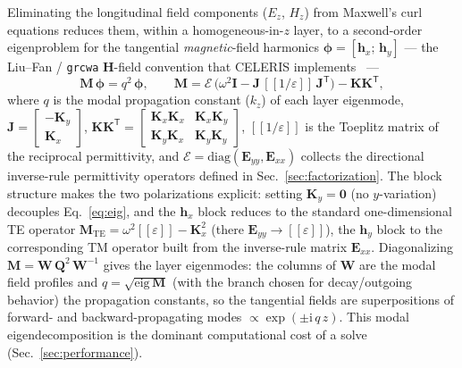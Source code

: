 \documentclass[preprint,12pt]{elsarticle}
\providecommand{\llbracket}{[\![}
\providecommand{\rrbracket}{]\!]}
\begin{document}
Eliminating the longitudinal field components ($E_z$, $H_z$) from Maxwell's curl
equations reduces them, within a homogeneous-in-$z$ layer, to a second-order
eigenproblem for the tangential \emph{magnetic}-field harmonics
$\boldsymbol{\phi}=[\mathbf{h}_x;\,\mathbf{h}_y]$ --- the Liu--Fan / \texttt{grcwa}
$\mathbf{H}$-field convention that CELERIS implements~\cite{liu2012s4,grcwa} ---
\begin{equation}
\mathbf{M}\,\boldsymbol{\phi} = q^2\,\boldsymbol{\phi},
\qquad
\mathbf{M} = \boldsymbol{\mathcal{E}}\,
   \big(\omega^2\mathbf{I} - \mathbf{J}\,\llbracket 1/\varepsilon\rrbracket\,
   \mathbf{J}^{\mathsf{T}}\big) - \mathbf{K}\mathbf{K}^{\mathsf{T}},
\label{eq:eig}
\end{equation}
where $q$ is the modal propagation constant ($k_z$) of each layer eigenmode,
$\mathbf{J}=\left[\begin{smallmatrix}-\mathbf{K}_y\\ \mathbf{K}_x\end{smallmatrix}\right]$,
$\mathbf{K}\mathbf{K}^{\mathsf{T}}=
\left[\begin{smallmatrix}\mathbf{K}_x\mathbf{K}_x & \mathbf{K}_x\mathbf{K}_y\\[2pt]
\mathbf{K}_y\mathbf{K}_x & \mathbf{K}_y\mathbf{K}_y\end{smallmatrix}\right]$,
$\llbracket 1/\varepsilon\rrbracket$ is the Toeplitz matrix of the reciprocal
permittivity, and $\boldsymbol{\mathcal{E}}=\mathrm{diag}(\mathbf{E}_{yy},
\mathbf{E}_{xx})$ collects the directional inverse-rule permittivity operators
defined in Sec.~\ref{sec:factorization}. The block structure makes the two
polarizations explicit: setting $\mathbf{K}_y=\mathbf{0}$ (no $y$-variation)
decouples Eq.~\eqref{eq:eig}, and the $\mathbf{h}_x$ block reduces to the standard
one-dimensional TE operator
$\mathbf{M}_{\mathrm{TE}}=\omega^2\llbracket\varepsilon\rrbracket-\mathbf{K}_x^2$
(there $\mathbf{E}_{yy}\!\to\!\llbracket\varepsilon\rrbracket$), the $\mathbf{h}_y$
block to the corresponding TM operator built from the inverse-rule matrix
$\mathbf{E}_{xx}$. Diagonalizing $\mathbf{M}=\mathbf{W}\,\mathbf{Q}^2\,
\mathbf{W}^{-1}$ gives the layer eigenmodes: the columns of $\mathbf{W}$ are the
modal field profiles and $q=\sqrt{\text{eig}\,\mathbf{M}}$ (with the branch chosen
for decay/outgoing behavior) the propagation constants, so the tangential fields
are superpositions of forward- and backward-propagating modes $\propto
\exp(\pm\mathrm{i}\,q\,z)$. This modal eigendecomposition is the dominant
computational cost of a solve (Sec.~\ref{sec:performance}).
\end{document}
